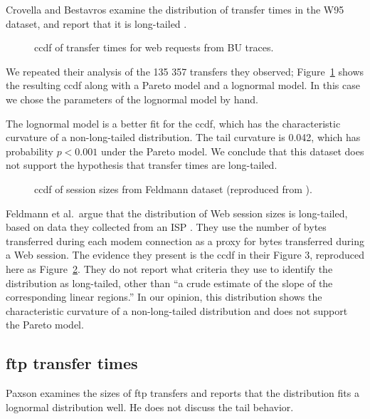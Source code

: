 \documentclass{elsart}
\begin{document}
Crovella and Bestavros examine the distribution of transfer
times in the W95 dataset, and report that it is long-tailed
\cite{CrovellaBestavros96}.

\begin{figure}[tb]
\centerline{}
\caption{ccdf of transfer times for web requests from BU traces.}
\label{fig.transfer}
\end{figure}

We repeated their analysis of the 135 357 transfers they
observed; Figure~\ref{fig.transfer} shows the resulting ccdf along
with a Pareto model and a lognormal model.  In this case we chose the
parameters of the lognormal model by hand.

The lognormal model is a better fit for the ccdf, which has the
characteristic curvature of a non-long-tailed distribution.
The tail curvature is 0.042, which has
probability $p < 0.001$ under the Pareto model.
We conclude that this dataset does not support the hypothesis that
transfer times are long-tailed.

\begin{figure}[tb]
\centerline{}
\caption{ccdf of session sizes from Feldmann dataset
(reproduced from \cite{FeldmannGilbertWillingerKurtz98}).}
\label{fig.feldmann}
\end{figure}

Feldmann et al.~argue that the distribution of Web session sizes is
long-tailed, based on data they collected from an ISP
\cite{FeldmannGilbertWillingerKurtz98}.  They use the number of bytes
transferred during each modem connection as a proxy for bytes
transferred during a Web session.  The evidence they present
is the ccdf in their Figure 3, reproduced
here as Figure~\ref{fig.feldmann}.  They do not report what criteria
they use to identify the distribution as long-tailed, other than ``a
crude estimate of the slope of the corresponding linear regions.''
In our opinion, this distribution shows the
characteristic curvature of a non-long-tailed distribution
and does not support the Pareto model.


\subsection {ftp transfer times}
\label{ftp}

Paxson \cite{Paxson94} examines the sizes of ftp transfers and
reports that the distribution fits a lognormal distribution well.
He does not discuss the tail behavior.
\end{document}
